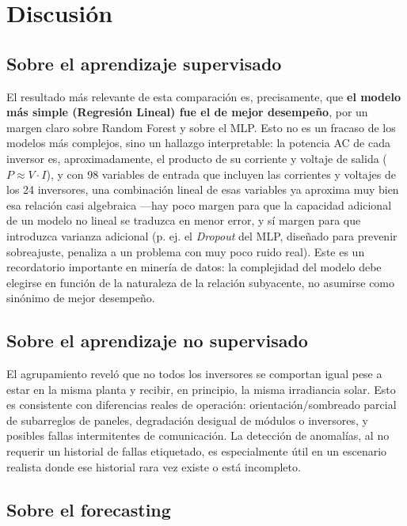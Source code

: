 \section{Discusión}
\label{sec:discusion}

\subsection*{Sobre el aprendizaje supervisado}

El resultado más relevante de esta comparación es, precisamente, que \textbf{el modelo más simple (Regresión Lineal) fue el de mejor desempeño}, por un margen claro sobre Random Forest y sobre el MLP. Esto no es un fracaso de los modelos más complejos, sino un hallazgo interpretable: la potencia AC de cada inversor es, aproximadamente, el producto de su corriente y voltaje de salida ($P \approx V \cdot I$), y con 98 variables de entrada que incluyen las corrientes y voltajes de los 24 inversores, una combinación lineal de esas variables ya aproxima muy bien esa relación casi algebraica —hay poco margen para que la capacidad adicional de un modelo no lineal se traduzca en menor error, y sí margen para que introduzca varianza adicional (p. ej. el \textit{Dropout} del MLP, diseñado para prevenir sobreajuste, penaliza a un problema con muy poco ruido real). Este es un recordatorio importante en minería de datos: la complejidad del modelo debe elegirse en función de la naturaleza de la relación subyacente, no asumirse como sinónimo de mejor desempeño.

\subsection*{Sobre el aprendizaje no supervisado}

El agrupamiento reveló que no todos los inversores se comportan igual pese a estar en la misma planta y recibir, en principio, la misma irradiancia solar. Esto es consistente con diferencias reales de operación: orientación/sombreado parcial de subarreglos de paneles, degradación desigual de módulos o inversores, y posibles fallas intermitentes de comunicación. La detección de anomalías, al no requerir un historial de fallas etiquetado, es especialmente útil en un escenario realista donde ese historial rara vez existe o está incompleto.

\subsection*{Sobre el forecasting}

